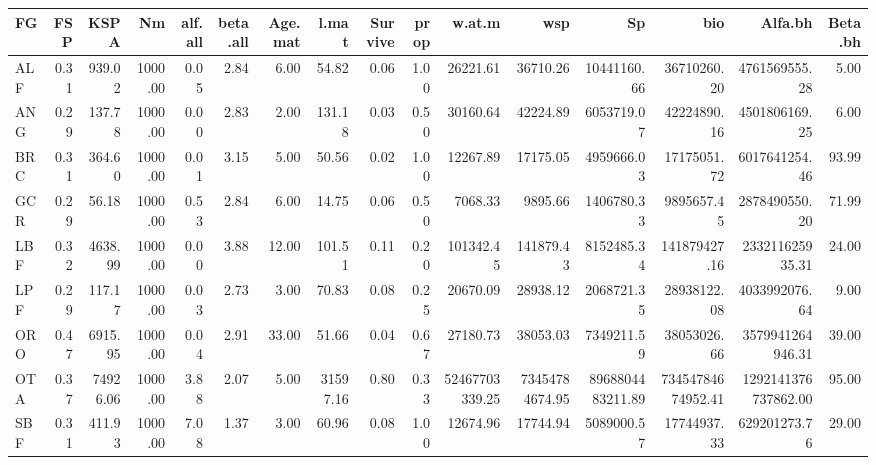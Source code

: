 \documentclass[11pt]{article}
\begin{document}
\begin{itemize}
\begin{itemize}
\begin{itemize}
\begin{center}
\begin{tabular}{lrrrrrrrrrrrrrrr}
 FG   &   FSP  &      KSPA  &       Nm  &  alf.all  &  beta.all  &  Age.mat  &     l.mat  &  Survive  &  prop  &          w.at.m  &             wsp  &                Sp  &                bio  &              Alfa.bh  &  Beta.bh  \\
\hline
 ALF  &  0.31  &    939.02  &  1000.00  &     0.05  &      2.84  &     6.00  &     54.82  &     0.06  &  1.00  &        26221.61  &        36710.26  &       10441160.66  &        36710260.20  &        4761569555.28  &     5.00  \\
 ANG  &  0.29  &    137.78  &  1000.00  &     0.00  &      2.83  &     2.00  &    131.18  &     0.03  &  0.50  &        30160.64  &        42224.89  &        6053719.07  &        42224890.16  &        4501806169.25  &     6.00  \\
 BRC  &  0.31  &    364.60  &  1000.00  &     0.01  &      3.15  &     5.00  &     50.56  &     0.02  &  1.00  &        12267.89  &        17175.05  &        4959666.03  &        17175051.72  &        6017641254.46  &    93.99  \\
 GCR  &  0.29  &     56.18  &  1000.00  &     0.53  &      2.84  &     6.00  &     14.75  &     0.06  &  0.50  &         7068.33  &         9895.66  &        1406780.33  &         9895657.45  &        2878490550.20  &    71.99  \\
 LBF  &  0.32  &   4638.99  &  1000.00  &     0.00  &      3.88  &    12.00  &    101.51  &     0.11  &  0.20  &       101342.45  &       141879.43  &        8152485.34  &       141879427.16  &      233211625935.31  &    24.00  \\
 LPF  &  0.29  &    117.17  &  1000.00  &     0.03  &      2.73  &     3.00  &     70.83  &     0.08  &  0.25  &        20670.09  &        28938.12  &        2068721.35  &        28938122.08  &        4033992076.64  &     9.00  \\
 ORO  &  0.47  &   6915.95  &  1000.00  &     0.04  &      2.91  &    33.00  &     51.66  &     0.04  &  0.67  &        27180.73  &        38053.03  &        7349211.59  &        38053026.66  &     3579941264946.31  &    39.00  \\
 OTA  &  0.37  &  74926.06  &  1000.00  &     3.88  &      2.07  &     5.00  &  31597.16  &     0.80  &  0.33  &  52467703339.25  &  73454784674.95  &  8968804483211.89  &  73454784674952.41  &  1292141376737862.00  &    95.00  \\
 SBF  &  0.31  &    411.93  &  1000.00  &     7.08  &      1.37  &     3.00  &     60.96  &     0.08  &  1.00  &        12674.96  &        17744.94  &        5089000.57  &        17744937.33  &         629201273.76  &    29.00  \\

\end{tabular}
\end{center}
\end{itemize}
\end{itemize}
\end{itemize}
\end{document}
